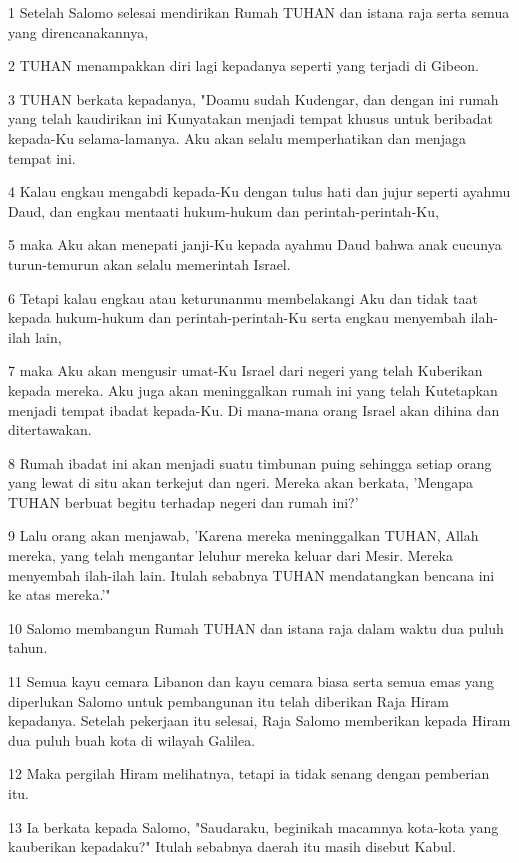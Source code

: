 \par 1 Setelah Salomo selesai mendirikan Rumah TUHAN dan istana raja serta semua yang direncanakannya,
\par 2 TUHAN menampakkan diri lagi kepadanya seperti yang terjadi di Gibeon.
\par 3 TUHAN berkata kepadanya, "Doamu sudah Kudengar, dan dengan ini rumah yang telah kaudirikan ini Kunyatakan menjadi tempat khusus untuk beribadat kepada-Ku selama-lamanya. Aku akan selalu memperhatikan dan menjaga tempat ini.
\par 4 Kalau engkau mengabdi kepada-Ku dengan tulus hati dan jujur seperti ayahmu Daud, dan engkau mentaati hukum-hukum dan perintah-perintah-Ku,
\par 5 maka Aku akan menepati janji-Ku kepada ayahmu Daud bahwa anak cucunya turun-temurun akan selalu memerintah Israel.
\par 6 Tetapi kalau engkau atau keturunanmu membelakangi Aku dan tidak taat kepada hukum-hukum dan perintah-perintah-Ku serta engkau menyembah ilah-ilah lain,
\par 7 maka Aku akan mengusir umat-Ku Israel dari negeri yang telah Kuberikan kepada mereka. Aku juga akan meninggalkan rumah ini yang telah Kutetapkan menjadi tempat ibadat kepada-Ku. Di mana-mana orang Israel akan dihina dan ditertawakan.
\par 8 Rumah ibadat ini akan menjadi suatu timbunan puing sehingga setiap orang yang lewat di situ akan terkejut dan ngeri. Mereka akan berkata, 'Mengapa TUHAN berbuat begitu terhadap negeri dan rumah ini?'
\par 9 Lalu orang akan menjawab, 'Karena mereka meninggalkan TUHAN, Allah mereka, yang telah mengantar leluhur mereka keluar dari Mesir. Mereka menyembah ilah-ilah lain. Itulah sebabnya TUHAN mendatangkan bencana ini ke atas mereka.'"
\par 10 Salomo membangun Rumah TUHAN dan istana raja dalam waktu dua puluh tahun.
\par 11 Semua kayu cemara Libanon dan kayu cemara biasa serta semua emas yang diperlukan Salomo untuk pembangunan itu telah diberikan Raja Hiram kepadanya. Setelah pekerjaan itu selesai, Raja Salomo memberikan kepada Hiram dua puluh buah kota di wilayah Galilea.
\par 12 Maka pergilah Hiram melihatnya, tetapi ia tidak senang dengan pemberian itu.
\par 13 Ia berkata kepada Salomo, "Saudaraku, beginikah macamnya kota-kota yang kauberikan kepadaku?" Itulah sebabnya daerah itu masih disebut Kabul.
